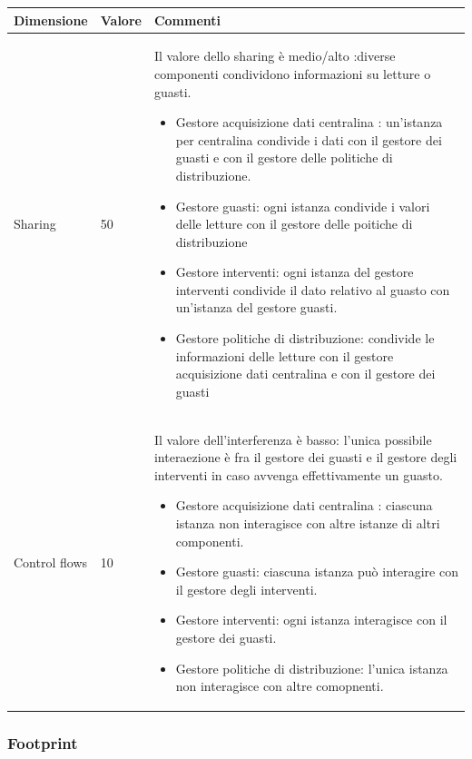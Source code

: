 \documentclass{beamer}
\begin{document}
\begin{frame}[allowframebreaks]
		\begin{center}
			\begin{table}
				\tiny
				\centering
				{\renewcommand{\arraystretch}{1.2}
					
					\begin{tabular}{|M{0.1\textwidth}|M{0.1\textwidth}|p{.6\textwidth}|}
						\hline
						Dimensione & Valore & Commenti \\
						\hline
						Sharing & 50 & Il valore dello sharing è medio/alto :diverse componenti condividono informazioni su letture o guasti.
						\begin{itemize}
							\item Gestore acquisizione dati centralina : un'istanza per centralina condivide i dati con il gestore dei guasti e con il gestore delle politiche di distribuzione.
							\item Gestore guasti: ogni istanza condivide i valori delle letture con il gestore delle poitiche di distribuzione 
							\item Gestore interventi: ogni istanza del gestore interventi condivide il dato relativo al guasto con un'istanza del gestore guasti.
							\item Gestore politiche di distribuzione: condivide le informazioni delle letture con il gestore acquisizione dati centralina e con il gestore dei guasti
						\end{itemize} \\
						Control flows  & 10 & Il valore dell'interferenza è basso: l'unica possibile interaezione è fra il gestore dei guasti e il gestore degli interventi in caso avvenga effettivamente un guasto.
						\begin{itemize}
							\item Gestore acquisizione dati centralina : ciascuna istanza non interagisce con altre istanze di altri componenti.
							\item Gestore guasti:  ciascuna istanza può interagire con il gestore degli interventi.
							\item Gestore interventi: ogni istanza interagisce con il gestore dei guasti.
							\item Gestore politiche di distribuzione: 
							l'unica istanza non interagisce con altre comopnenti.
						\end{itemize} \\
						\hline
				\end{tabular}}
			\end{table}
		\end{center}	
	\end{frame}

	\subsubsection{Footprint}
	\begin{frame}
	\end{frame}
\end{document}
